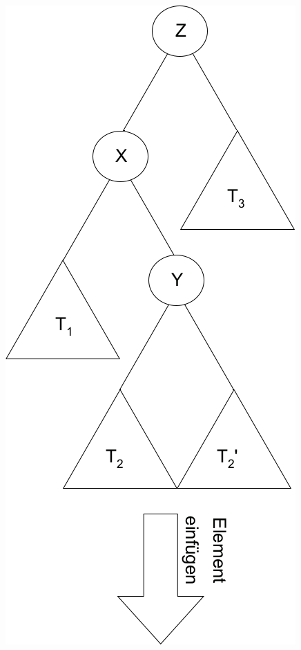 \begin{figure}
\includegraphics[width=\linewidth]{11/Grafik/img4_doppelRotation_1.png}
\end{figure}

